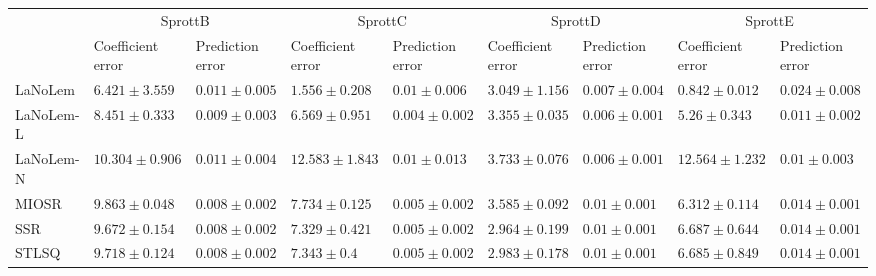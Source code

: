 \begin{table*}
{\begin{tabular}{lllllllll}
 & \multicolumn{2}{c}{SprottB} & \multicolumn{2}{c}{SprottC} & \multicolumn{2}{c}{SprottD} & \multicolumn{2}{c}{SprottE} \\
 & Coefficient error & Prediction error & Coefficient error & Prediction error & Coefficient error & Prediction error & Coefficient error & Prediction error \\
\midrule
LaNoLem & $\mathbf{6.421}\pm 3.559$ & $0.011\pm 0.005$ & $\mathbf{1.556}\pm 0.208$ & $0.01\pm 0.006$ & $3.049\pm 1.156$ & $0.007\pm 0.004$ & $\mathbf{0.842}\pm 0.012$ & $0.024\pm 0.008$ \\
LaNoLem-L & $8.451\pm 0.333$ & $0.009\pm 0.003$ & $6.569\pm 0.951$ & $\mathbf{0.004}\pm 0.002$ & $3.355\pm 0.035$ & $0.006\pm 0.001$ & $5.26\pm 0.343$ & $0.011\pm 0.002$ \\
LaNoLem-N & $10.304\pm 0.906$ & $0.011\pm 0.004$ & $12.583\pm 1.843$ & $0.01\pm 0.013$ & $3.733\pm 0.076$ & $\mathbf{0.006}\pm 0.001$ & $12.564\pm 1.232$ & $\mathbf{0.01}\pm 0.003$ \\
MIOSR & $9.863\pm 0.048$ & $0.008\pm 0.002$ & $7.734\pm 0.125$ & $0.005\pm 0.002$ & $3.585\pm 0.092$ & $0.01\pm 0.001$ & $6.312\pm 0.114$ & $0.014\pm 0.001$ \\
SSR & $9.672\pm 0.154$ & $\mathbf{0.008}\pm 0.002$ & $7.329\pm 0.421$ & $0.005\pm 0.002$ & $\mathbf{2.964}\pm 0.199$ & $0.01\pm 0.001$ & $6.687\pm 0.644$ & $0.014\pm 0.001$ \\
STLSQ & $9.718\pm 0.124$ & $0.008\pm 0.002$ & $7.343\pm 0.4$ & $0.005\pm 0.002$ & $2.983\pm 0.178$ & $0.01\pm 0.001$ & $6.685\pm 0.849$ & $0.014\pm 0.001$ \\

\midrule


\end{tabular}}
\end{table*}
